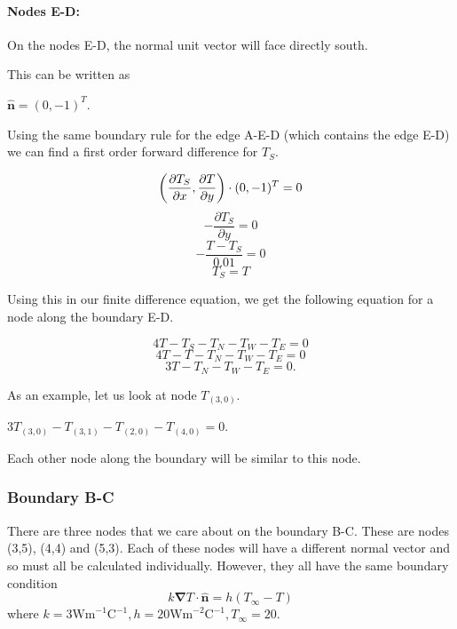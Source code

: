 \documentclass[12pt,a4paper]{article}
\begin{document}
\paragraph*{Nodes E-D:} On the nodes E-D, the normal unit vector will face directly south. 
\begin{center}
\end{center}
This can be written as 
\begin{center}
  $\hat{\textbf{n}}=(0,-1)^T$.
\end{center}
Using the same boundary rule for the edge A-E-D (which contains the edge E-D) we can find a first order forward difference for $T_S$.
\begin{center}
\[\bigg{(}\frac{\partial T_S}{\partial x},\frac{\partial T}{\partial y}\bigg{)}\cdot (0,-1)^T = 0\]
\[-\frac{\partial T_S}{\partial y}=0\]
\[-\frac{T-T_S}{0.01}=0\]
\[T_S=T\]
\end{center} 
Using this in our finite difference equation, we get the following equation for a node along the boundary E-D.
\begin{center}
  \[4T-T_S-T_N-T_W-T_E=0\]
  \[4T-T-T_N-T_W-T_E=0\]
  \[3T-T_N-T_W-T_E=0.\]
\end{center}
As an example, let us look at node $T_{(3,0)}$.
\begin{center}
  $3T_{(3,0)}-T_{(3,1)}-T_{(2,0)}-T_{(4,0)}=0$.
\end{center}
Each other node along the boundary will be similar to this node.
\subsubsection{Boundary B-C}
There are three nodes that we care about on the boundary B-C. These are nodes (3,5), (4,4) and (5,3). Each of these nodes will have a different normal vector and so must all be calculated individually. However, they all have the same boundary condition 
\[k\boldsymbol{\nabla}T\cdot\hat{\textbf{n}} = h(T_{\infty} - T)\]
where $k=3\text{Wm}^{-1}\text{C}^{-1}, h=20\text{Wm}^{-2}\text{C}^{-1}, T_\infty=20$.
\end{document}
